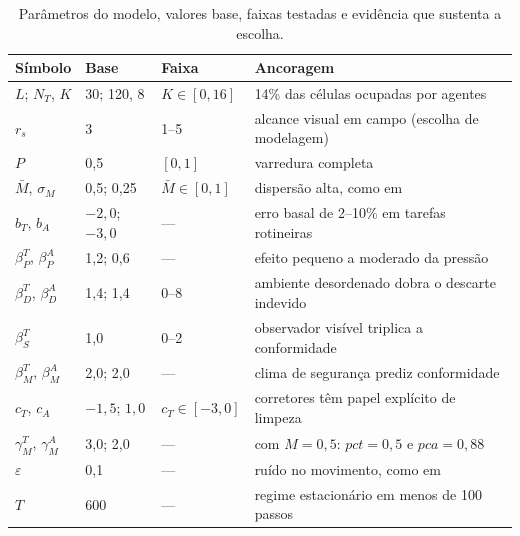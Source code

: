 \documentclass[11pt, a4paper]{article}
\begin{document}
\begin{table}[t]
\centering
\footnotesize
\caption{Parâmetros do modelo, valores base, faixas testadas e evidência que sustenta a escolha.}
\label{tab:parametros_modelo}
\begin{tabular}{@{}lllp{7.6cm}@{}}
\toprule
Símbolo & Base & Faixa & Ancoragem \\
\midrule
$L$; $N_T$, $K$ & 30; 120, 8 & $K\in[0,16]$ & 14\% das células ocupadas por agentes \\
$r_s$ & 3 & 1--5 & alcance visual em campo (escolha de modelagem) \\
$P$ & 0,5 & $[0,1]$ & varredura completa \\
$\bar{M}$, $\sigma_M$ & 0,5; 0,25 & $\bar M\in[0,1]$ & dispersão alta, como em \citet{rangoni2017} \\
$b_T$, $b_A$ & $-2{,}0$; $-3{,}0$ & --- & erro basal de 2--10\% em tarefas rotineiras \citep{kirwan1994} \\
$\beta_P^T$, $\beta_P^A$ & 1,2; 0,6 & --- & efeito pequeno a moderado da pressão \citep{szalma2008} \\
$\beta_D^T$, $\beta_D^A$ & 1,4; 1,4 & 0--8 & ambiente desordenado dobra o descarte indevido \citep{keizer2008,cialdini1990} \\
$\beta_S^T$ & 1,0 & 0--2 & observador visível triplica a conformidade \citep{srigley2014} \\
$\beta_M^T$, $\beta_M^A$ & 2,0; 2,0 & --- & clima de segurança prediz conformidade \citep{christian2009} \\
$c_T$, $c_A$ & $-1{,}5$; $1{,}0$ & $c_T\in[-3,0]$ & corretores têm papel explícito de limpeza \citep{rangoni2017} \\
$\gamma_M^T$, $\gamma_M^A$ & 3,0; 2,0 & --- & com $M=0{,}5$: $pct=0{,}5$ e $pca=0{,}88$ \\
$\varepsilon$ & 0,1 & --- & ruído no movimento, como em \citet{rangoni2017} \\
$T$ & 600 & --- & regime estacionário em menos de 100 passos \\
\bottomrule
\end{tabular}
\end{table}
\end{document}
